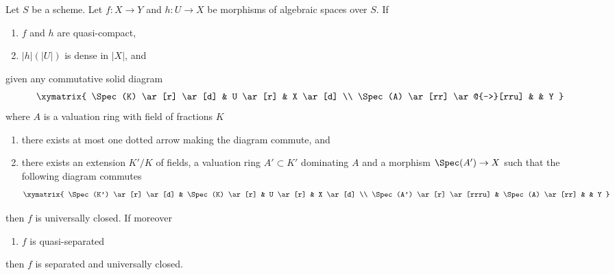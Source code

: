 %
\begin{lemma}
\label{lemma-refined-valuative-criterion-universally-closed}
Let $S$ be a scheme. Let $f : X \to Y$ and $h : U \to X$ be morphisms of
algebraic spaces over $S$. If
\begin{enumerate}
\item $f$ and $h$ are quasi-compact,
\item $|h|(|U|)$ is dense in $|X|$, and
\end{enumerate}
given any commutative solid diagram
$$
\xymatrix{
\Spec(K) \ar[r] \ar[d] & U \ar[r] & X \ar[d] \\
\Spec(A) \ar[rr] \ar@{-->}[rru] & & Y
}
$$
where $A$ is a valuation ring with field of fractions $K$
\begin{enumerate}
\item[(3)] there exists at most one dotted arrow making the diagram
commute, and
\item[(4)] there exists an extension $K'/K$ of fields, a
valuation ring $A' \subset K'$ dominating $A$ and a morphism
$\Spec(A') \to X$ such that the following diagram commutes
$$
\xymatrix{
\Spec(K') \ar[r] \ar[d] & \Spec(K) \ar[r] & U \ar[r] & X \ar[d] \\
\Spec(A') \ar[r] \ar[rrru] & \Spec(A) \ar[rr] & & Y
}
$$
\end{enumerate}
then $f$ is universally closed. If moreover
\begin{enumerate}
\item[(5)] $f$ is quasi-separated
\end{enumerate}
then $f$ is separated and universally closed.
\end{lemma}

